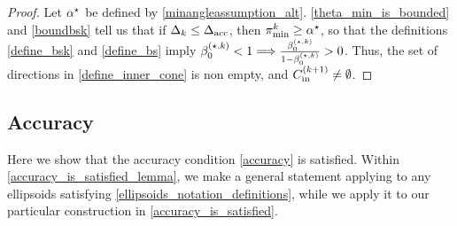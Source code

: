 
\begin{proof}
Let ${ \alpha^{\star} }$ be defined by \cref{minangleassumption_alt}.
\cref{theta_min_is_bounded} and \cref{boundbsk} tell us that 
if $\Delta_k \le {\Delta_{\textrm{acc}}}$, then ${\pi^k_{\textrm{min}}} \ge { \alpha^{\star} }$, 
so that the definitions \cref{define_bsk} and \cref{define_bs} imply
${\beta_0^{(\star, k)}} < 1 \Longrightarrow \frac{{\beta_0^{(\star, k)}}}{1 - {\beta_0^{(\star, k)}}} > 0$.
Thus, the set of directions in \cref{define_inner_cone} is non empty, and
${C^{(k+1)}_{\textrm{in}}} \ne \emptyset$.
\end{proof}


\subsection{Accuracy}
\label{accuracy_section}

Here we show that the accuracy condition \cref{accuracy} is satisfied.
Within \cref{accuracy_is_satisfied_lemma}, we make a general statement applying to any ellipsoids satisfying \cref{ellipsoids_notation_definitions},
while we apply it to our particular construction in \cref{accuracy_is_satisfied}.





